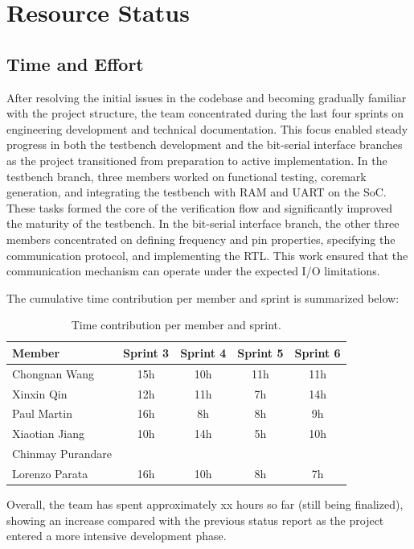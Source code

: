 \documentclass[10pt]{article}
\begin{document}
\section{Resource Status}
\subsection{Time and Effort}
After resolving the initial issues in the codebase and becoming gradually familiar with the project structure, the team concentrated during the last four sprints on engineering development and technical documentation. This focus enabled steady progress in both the testbench development and the bit-serial interface branches as the project transitioned from preparation to active implementation.
In the testbench branch, three members worked on functional testing, coremark generation, and integrating the testbench with RAM and UART on the SoC. These tasks formed the core of the verification flow and significantly improved the maturity of the testbench.
In the bit-serial interface branch, the other three members concentrated on defining frequency and pin properties, specifying the communication protocol, and implementing the RTL. This work ensured that the communication mechanism can operate under the expected I/O limitations.

The cumulative time contribution per member and sprint is summarized below:

\begin{table}[h!]
\centering
\begin{tabular}{lcccc}
\hline
\textbf{Member} & \textbf{Sprint 3} & \textbf{Sprint 4} & \textbf{Sprint 5} & \textbf{Sprint 6} \\
\hline
Chongnan Wang & 15h & 10h & 11h & 11h\\
Xinxin Qin & 12h & 11h & 7h & 14h \\
Paul Martin & 16h & 8h & 8h & 9h \\
Xiaotian Jiang & 10h & 14h & 5h & 10h \\
Chinmay Purandare & &  &  & \\
Lorenzo Parata & 16h & 10h &  8h& 7h\\
\hline
\end{tabular}
\caption{Time contribution per member and sprint.}
\end{table}

Overall, the team has spent approximately xx hours so far (still being finalized), showing an increase compared with the previous status report as the project entered a more intensive development phase.
\end{document}

